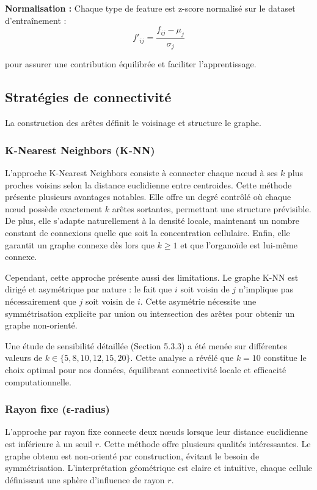 \textbf{Normalisation :}
Chaque type de feature est z-score normalisé sur le dataset d'entraînement :
\[
f'_{ij} = \frac{f_{ij} - \mu_j}{\sigma_j}
\]

pour assurer une contribution équilibrée et faciliter l'apprentissage.

\subsection{Stratégies de connectivité}

La construction des arêtes définit le voisinage et structure le graphe.

\subsubsection{K-Nearest Neighbors (K-NN)}

L'approche K-Nearest Neighbors consiste à connecter chaque nœud à ses $k$ plus proches voisins selon la distance euclidienne entre centroides. Cette méthode présente plusieurs avantages notables. Elle offre un degré contrôlé où chaque nœud possède exactement $k$ arêtes sortantes, permettant une structure prévisible. De plus, elle s'adapte naturellement à la densité locale, maintenant un nombre constant de connexions quelle que soit la concentration cellulaire. Enfin, elle garantit un graphe connexe dès lors que $k \geq 1$ et que l'organoïde est lui-même connexe.

Cependant, cette approche présente aussi des limitations. Le graphe K-NN est dirigé et asymétrique par nature : le fait que $i$ soit voisin de $j$ n'implique pas nécessairement que $j$ soit voisin de $i$. Cette asymétrie nécessite une symmétrisation explicite par union ou intersection des arêtes pour obtenir un graphe non-orienté.

Une étude de sensibilité détaillée (Section 5.3.3) a été menée sur différentes valeurs de $k \in \{5, 8, 10, 12, 15, 20\}$. Cette analyse a révélé que $k = 10$ constitue le choix optimal pour nos données, équilibrant connectivité locale et efficacité computationnelle.

\subsubsection{Rayon fixe (ε-radius)}

L'approche par rayon fixe connecte deux nœuds lorsque leur distance euclidienne est inférieure à un seuil $r$. Cette méthode offre plusieurs qualités intéressantes. Le graphe obtenu est non-orienté par construction, évitant le besoin de symmétrisation. L'interprétation géométrique est claire et intuitive, chaque cellule définissant une sphère d'influence de rayon $r$.

